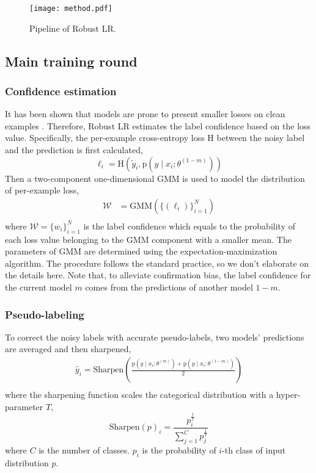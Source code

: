 \documentclass[letterpaper]{article} \usepackage{aaai23}  \usepackage{times}  \usepackage{helvet}  \usepackage{courier}  \usepackage[hyphens]{url}  \usepackage{graphicx} \urlstyle{rm} \def\UrlFont{\rm}  \usepackage{natbib}  \usepackage{caption} \frenchspacing  \setlength{\pdfpagewidth}{8.5in} \setlength{\pdfpageheight}{11in} \usepackage{algorithm}
\begin{document}
\begin{figure}
\centering
\texttt{[image: method.pdf]}
    \caption{Pipeline of Robust LR.
    }
    \label{fig_Robust LR}
\end{figure}


\subsection{Main training round}
\subsubsection{Confidence estimation}
It has been shown that models are prone to present smaller losses on clean examples \cite{arpit2017closer,chen2019understanding,han2018co,li2020dividemix}.
Therefore, Robust LR estimates the label confidence based on the loss value.
Specifically, the per-example cross-entropy loss $\text{H}$ between the noisy label and the prediction is first calculated,
\begin{equation} 
        \ell_i=\text{H}(\tilde{y}_i, \text{p}(y\mid x_i;\theta^{(1-m)}))
\end{equation}
Then a two-component one-dimensional GMM is used to model the distribution of per-example loss,
\begin{equation}
    \begin{aligned}
        \mathcal{W}&=\text{GMM}(\{(\ell_i)\}_{i=1}^{N})\\
    \end{aligned}
\end{equation}
where $\mathcal{W}=\{w_i\}^N_{i=1}$ is the label confidence which equals to the probability of each loss value belonging to the GMM component with a smaller mean.
The parameters of GMM are determined using the expectation-maximization algorithm. 
The procedure follows the standard practice,  so we don't elaborate on the details here.
Note that, to alleviate confirmation bias, the label confidence for the current model $m$ comes from the predictions of another model $1-m$. 

\subsubsection{Pseudo-labeling}
To correct the noisy labels with accurate pseudo-labels, two models' predictions are averaged and then sharpened,
\begin{equation}
    \begin{aligned}
        \hat{y}_i=\text{Sharpen}(\frac{\text{p}(y\mid x_i;\theta^{(m)})+\text{p}(y\mid x_i;\theta^{(1-m)})}{2})\\
    \end{aligned}
\end{equation}
where the sharpening function scales the categorical distribution with a hyper-parameter $T$,
\begin{equation}
    \text{Sharpen}(p)_i=\frac{p_i^{\frac{1}{T}}}{\sum_{j=1}^{C}p^{\frac{1}{T}}_{j}}
\end{equation}
where $C$ is the number of classes. $p_i$ is the probability of $i$-th class of input distribution $p$.
\end{document}
